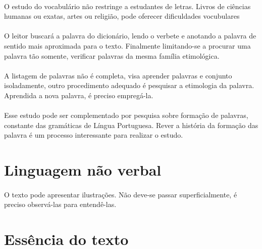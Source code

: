 \paragraph{}
O estudo do vocabulário não restringe a estudantes de letras. Livros de ciências humanas ou exatas, artes ou religião, pode oferecer dificuldades vocubulares

\paragraph{}
O leitor buscará a palavra do dicionário, lendo o verbete e anotando a palavra de sentido mais aproximada para o texto. Finalmente limitando-se a procurar uma palavra tão somente, verificar palavras da mesma família etimológica.

\paragraph{}
A listagem de palavras não é completa, visa aprender palavras e conjunto isoladamente, outro procedimento adequado é pesquisar a etimologia da palavra. Aprendida a nova palavra, é preciso empregá-la.

\paragraph{}
Esse estudo pode ser complementado por pesquisa sobre formação de palavras, constante das gramáticas de Língua Portuguesa. Rever a história da formação das palavra é um processo interessante para realizar o estudo.

\section{Linguagem não verbal}

\paragraph{}

O texto pode apresentar ilustrações. Não deve-se passar superficialmente, é preciso observá-las para entendê-las.

\section{Essência do texto}

\paragraph{}

